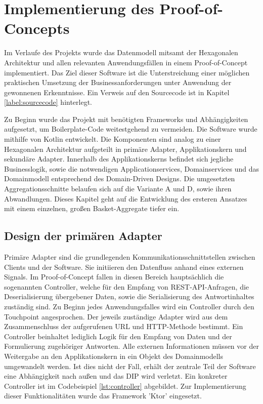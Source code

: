 \chapter{Implementierung des Proof-of-Concepts}

Im Verlaufe des Projekts wurde das Datenmodell mitsamt der Hexagonalen Architektur und allen relevanten Anwendungsfällen in einem Proof-of-Concept implementiert. Das Ziel dieser Software ist die Unterstreichung einer möglichen praktischen Umsetzung der Businessanforderungen unter Anwendung der gewonnenen Erkenntnisse. Ein Verweis auf den Sourcecode ist in Kapitel \ref{label:sourcecode} hinterlegt. 

Zu Beginn wurde das Projekt mit benötigten Frameworks und Abhängigkeiten aufgesetzt, um \gls{Boilerplate-Code} weitestgehend zu vermeiden. Die Software wurde mithilfe von Kotlin entwickelt. Die Komponenten sind analog zu einer Hexagonalen Architektur aufgeteilt in primäre Adapter, Applikationskern und sekundäre Adapter. Innerhalb des Applikationskerns befindet sich jegliche Businesslogik, sowie die notwendigen Applicationservices, Domainservices und das Domainmodell entsprechend des Domain-Driven Designs. Die umgesetzten Aggregationsschnitte belaufen sich auf die Variante A und D, sowie ihren Abwandlungen. Dieses Kapitel geht auf die Entwicklung des ersteren Ansatzes mit einem einzelnen, großen Basket-Aggregate tiefer ein.

\section{Design der primären Adapter}

Primäre Adapter sind die grundlegenden Kommunikationsschnittstellen zwischen Clients und der Software. Sie initiieren den Datenfluss anhand eines externen Signals. Im Proof-of-Concept fallen in diesen Bereich hauptsächlich die sogenannten Controller, welche für den Empfang von REST-API-Anfragen, die Deserialisierung übergebener Daten, sowie die Serialisierung des Antwortinhaltes zuständig sind. Zu Beginn jedes Anwendungsfalles wird ein Controller durch den Touchpoint angesprochen. Der jeweils zuständige Adapter wird aus dem Zusammenschluss der aufgerufenen URL und HTTP-Methode bestimmt. Ein Controller beinhaltet lediglich Logik für den Empfang von Daten und der Formulierung zugehöriger Antworten. Alle externen Informationen müssen vor der Weitergabe an den Applikationskern in ein Objekt des Domainmodells umgewandelt werden. Ist dies nicht der Fall, erhält der zentrale Teil der Software eine Abhängigkeit nach außen und das \acrlong{DIP} wird verletzt. Ein konkreter Controller ist im Codebeispiel \ref{lst:controller} abgebildet. Zur Implementierung dieser Funktionalitäten wurde das Framework 'Ktor' eingesetzt.

